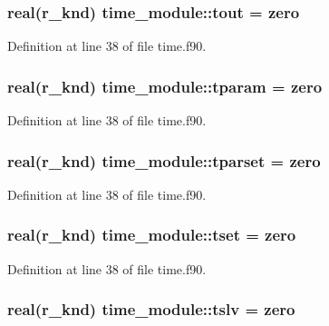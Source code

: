 \hypertarget{classtime__module_a67fe4201db76455b13a6140ddeb5c57d}{
\subsubsection[{tout}]{\setlength{\rightskip}{0pt plus 5cm}real(r\-\_\-knd) time\-\_\-module\-::tout = zero}}\label{classtime__module_a67fe4201db76455b13a6140ddeb5c57d}


Definition at line 38 of file time.\-f90.

\hypertarget{classtime__module_ab78f7d01ea1bde455310853bc2be1594}{
\subsubsection[{tparam}]{\setlength{\rightskip}{0pt plus 5cm}real(r\-\_\-knd) time\-\_\-module\-::tparam = zero}}\label{classtime__module_ab78f7d01ea1bde455310853bc2be1594}


Definition at line 38 of file time.\-f90.

\hypertarget{classtime__module_a5265ce5bfd23e9a9a77547577f88473d}{
\subsubsection[{tparset}]{\setlength{\rightskip}{0pt plus 5cm}real(r\-\_\-knd) time\-\_\-module\-::tparset = zero}}\label{classtime__module_a5265ce5bfd23e9a9a77547577f88473d}


Definition at line 38 of file time.\-f90.

\hypertarget{classtime__module_a81f8cc404349dd114670913d2d11f055}{
\subsubsection[{tset}]{\setlength{\rightskip}{0pt plus 5cm}real(r\-\_\-knd) time\-\_\-module\-::tset = zero}}\label{classtime__module_a81f8cc404349dd114670913d2d11f055}


Definition at line 38 of file time.\-f90.

\hypertarget{classtime__module_a1f3f475f37c8ce006cdd2de5693552d9}{
\subsubsection[{tslv}]{\setlength{\rightskip}{0pt plus 5cm}real(r\-\_\-knd) time\-\_\-module\-::tslv = zero}}\label{classtime__module_a1f3f475f37c8ce006cdd2de5693552d9}


